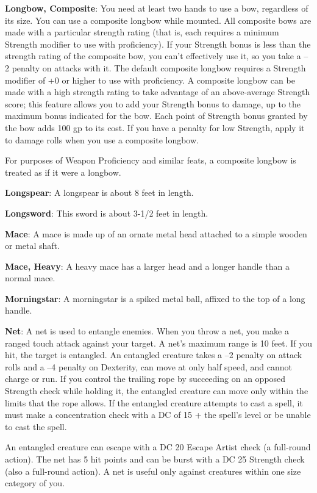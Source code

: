 \textbf{Longbow, Composite}: You need at least two hands to use a bow, regardless of its size. You can use a composite longbow while mounted. All composite bows are made with a particular strength rating (that is, each requires a minimum Strength modifier to use with proficiency). If your Strength bonus is less than the strength rating of the composite bow, you can't effectively use it, so you take a --2 penalty on attacks with it. The default composite longbow requires a Strength modifier of +0 or higher to use with proficiency. A composite longbow can be made with a high strength rating to take advantage of an above-average Strength score; this feature allows you to add your Strength bonus to damage, up to the maximum bonus indicated for the bow. Each point of Strength bonus granted by the bow adds 100 gp to its cost. If you have a penalty for low Strength, apply it to damage rolls when you use a composite longbow.
		
For purposes of Weapon Proficiency and similar feats, a composite longbow is treated as if it were a longbow.
		
\textbf{Longspear}: A longspear is about 8 feet in length.
		
\textbf{Longsword}: This sword is about 3-1/2 feet in length.
		
\textbf{Mace}: A mace is made up of an ornate metal head attached to a simple wooden or metal shaft.
		
\textbf{Mace, Heavy}: A heavy mace has a larger head and a longer handle than a normal mace.
		
\textbf{Morningstar}: A morningstar is a spiked metal ball, affixed to the top of a long handle.
		
\textbf{Net}: A net is used to entangle enemies. When you throw a net, you make a ranged touch attack against your target. A net's maximum range is 10 feet. If you hit, the target is entangled. An entangled creature takes a --2 penalty on attack rolls and a --4 penalty on Dexterity, can move at only half speed, and cannot charge or run. If you control the trailing rope by succeeding on an opposed Strength check while holding it, the entangled creature can move only within the limits that the rope allows. If the entangled creature attempts to cast a spell, it must make a concentration check with a DC of 15 + the spell's level or be unable to cast the spell.
		
An entangled creature can escape with a DC 20 Escape Artist check (a full-round action). The net has 5 hit points and can be burst with a DC 25 Strength check (also a full-round action). A net is useful only against creatures within one size category of you.
		
